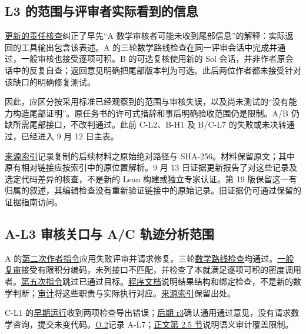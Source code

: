 \subsection[L3 的范围与评审者实际看到的信息]{\texorpdfstring{\protect\hypertarget{o3}{}L3 的范围与评审者实际看到的信息}{L3 的范围与评审者实际看到的信息}}
\href{verification/revision13/l3/REVIEW_MECHANISM_RECHECK.zh-CN.md}{更新的责任核查}纠正了早先“A 数学审核者可能未收到尾部信息”的解释：实际返回的工具输出包含该表述。A 的三轮数学路线检查在同一评审会话中完成并通过，一般审核也接受逐项可积。B 的可选复核使用新的 Sol 会话，并非作者原会话中的反复自查；返回意见明确把尾部版本判为可选。此后两位作者都未接受针对该缺口的明确修复测试。

因此，应区分按采用标准已经观察到的范围与审核失误，以及尚未测试的“没有能力构造尾部证明”。原任务书的许可式措辞和事后明确验收范围仍是限制。A/B 仍缺所需尾部接口，不改判通过。此前 C-L2、B-H1 及 B/C-L7 的失败或未决转通过，已经进入 9 月 12 日主表。

\href{verification/revision13/SOURCE_INDEX.json}{来源索引}记录复制的后续材料之原始绝对路径与 SHA-256。材料保留原文；其中原有相对链接应按索引中的原位置解析。9 月 13 日证据更新报告了对这些记录及选定代码差异的核查，不是新的 Lean 构建或独立专家认证。第 19 版保留这一有归属的叙述，其编辑检查没有重新验证链接中的原始记录。旧证据仍可通过保留的证据指南访问。

\subsection[A-L3 审核关口与 A/C 轨迹分析范围]{\texorpdfstring{\protect\hypertarget{o4}{}A-L3 审核关口与 A/C 轨迹分析范围}{A-L3 审核关口与 A/C 轨迹分析范围}}
A 的\href{verification/revision14/l3/author-call-02.txt}{第二次作者指令}应用失败评审并请求修复。三轮\href{verification/revision14/l3/math-gate-response.md}{数学路线检查}均通过。\href{verification/revision14/l3/general-v2.json}{一般复审}接受有限积分编码，未列接口不匹配，并检查了本就满足逐项可积的密度调用者。\href{verification/revision14/l3/author-call-05.txt}{第五次指令}跳过已通过目标。\href{verification/revision14/l3/workspace_state.excerpt.md}{程序文档}说明结果结构和绑定检查，不是新的数学判断；\href{verification/revision14/l3/gate-audit.zh-CN.md}{审计}将这些职责与实际执行对应。\href{verification/revision14/SOURCE_INDEX.json}{来源索引}保留出处。

C-L1 的\hyperlink{g9-2}{早期运行}收到两项检查导出错误；\hyperlink{g8}{后期 r3}确认通用通过意见，没有请求数学咨询，提交未变代码。\hyperlink{o2}{O.2}记录 A-L7；\href{zh.pdf\#section-2-5}{正文第 2.5 节}说明语义审计覆盖限制。

